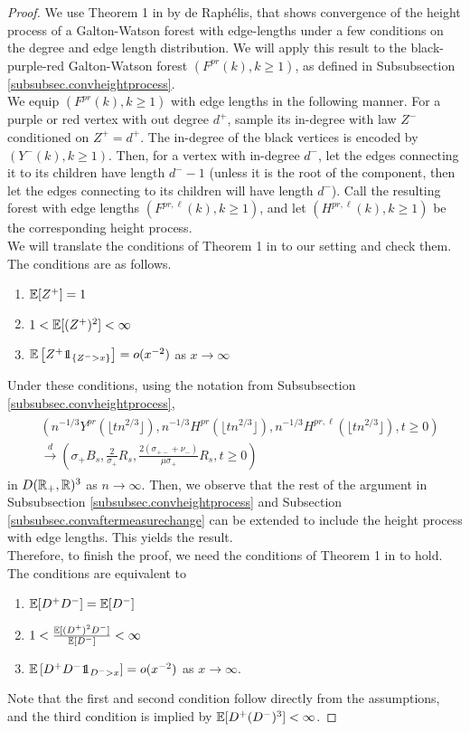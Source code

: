\begin{proof}
We use Theorem 1 in \cite{Deraphelis2017} by de Raphélis, that shows convergence of the height process of a Galton-Watson forest with edge-lengths under a few conditions on the degree and edge length distribution. We will apply this result to the black-purple-red Galton-Watson forest $(F^{pr}(k),k\geq 1)$, as defined in Subsubsection \ref{subsubsec.convheightprocess}. \\
We equip $(F^{pr}(k),k\geq 1)$ with edge lengths in the following manner. For a purple or red vertex with out degree $d^+$, sample its in-degree with law $Z^-$ conditioned on $Z^+=d^+$. The in-degree of the black vertices is encoded by $(Y^{-}(k),k\geq 1)$.  Then, for a vertex with in-degree $d^-$, let the edges connecting it to its children have length $d^--1$ (unless it is the root of the component, then let the edges connecting to its children will have length $d^-$). Call the resulting forest with edge lengths $(F^{pr,\ell}(k),k\geq 1)$, and let $(H^{pr,\ell}(k),k\geq 1)$ be the corresponding height process.\\
We will translate the conditions of Theorem 1 in \cite{Deraphelis2017} to our setting and check them. The conditions are as follows.
\begin{enumerate}
    \item ${\mathbb E}[Z^+]=1$
    \item $1<{\mathbb E}[(Z^+)^2]<\infty$
    \item $\E\left[Z^+\one_{\{Z^->x\}}\right]=o(x^{-2})$ as $x\to \infty$
\end{enumerate}
Under these conditions, using the notation from Subsubsection \ref{subsubsec.convheightprocess},
\begin{align}\begin{split}\label{eq.convmodifiedheightprocess}
&\left(n^{-1/3}Y^{pr}\left(\lfloor t n^{2/3}\rfloor \right),n^{-1/3}H^{pr}\left(\lfloor t n^{2/3}\rfloor \right), n^{-1/3}H^{pr,\ell}\left(\lfloor t n^{2/3}\rfloor \right),t\geq 0\right)\\
&\overset{d}{\to}\left(\sigma_+ B_s, \frac{2}{\sigma_+}R_s, \frac{2(\sigma_{+-}+\nu_-)}{\mu\sigma_+}R_s,t\geq 0\right)
\end{split}\end{align}
in $D({\mathbb R}_+,{\mathbb R})^3$ as $n\to \infty$. 
Then, we observe that the rest of the argument in Subsubsection \ref{subsubsec.convheightprocess} and Subsection \ref{subsubsec.convaftermeasurechange} can be extended to include the height process with edge lengths. This yields the result.\\
Therefore, to finish the proof, we need the conditions of Theorem 1 in \cite{Deraphelis2017} to hold. The conditions are equivalent to 
\begin{enumerate}
    \item ${\mathbb E}[D^+D^-]={\mathbb E}[D^-]$
    \item $1<\frac{{\mathbb E}[(D^+)^2D^-]}{{\mathbb E}[D^-]}<\infty$
    \item $\E\left[D^+D^-\one_{D^->x}\right]=o(x^{-2})$ as $x\to \infty$. 
\end{enumerate}
Note that the first and second condition follow directly from the assumptions, and the third condition is implied by ${\mathbb E}[D^+(D^-)^3]<\infty$.
\end{proof}
